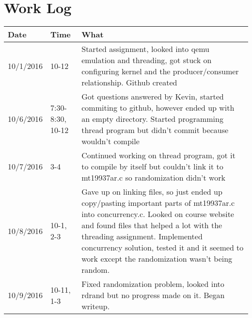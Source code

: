 \documentclass[letterpaper,10pt,titlepage]{article}
\begin{document}
\section{Work Log}
\begin{tabular}{ |p{3cm}|p{3cm}|p{5cm}| } 
 \hline


Date & Time & What \\
\hline
10/1/2016& 10-12&Started assignment, looked into qemu emulation and threading, got stuck on configuring kernel and the producer/consumer relationship. Github created \\
 \hline
10/6/2016& 7:30-8:30, 10-12&Got questions answered by Kevin, started commiting to github, however ended up with an empty directory. Started programming thread program but didn’t commit because wouldn’t compile \\
 \hline
10/7/2016 & 3-4 & Continued working on thread program, got it to compile by itself but couldn’t link it to mt19937ar.c so randomization didn’t work \\
 \hline
10/8/2016&10-1, 2-3 & Gave up on linking files, so just ended up copy/pasting important parts of mt19937ar.c into concurrency.c. Looked on course website and found files that helped a lot with the threading assignment. Implemented concurrency solution, tested it and it seemed to work except the randomization wasn’t being random. \\
 \hline
10/9/2016 & 10-11, 1-3 & Fixed randomization problem, looked into rdrand but no progress made on it. Began writeup. \\
 \hline

 \hline
\end{tabular}
\end{document}
